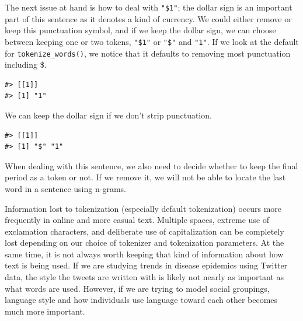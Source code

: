 \documentclass[
]{krantz}
\makeatletter
\newenvironment{Shaded}{\begin{snugshade}}{\end{snugshade}}
\newcommand{\AttributeTok}[1]{\textcolor[rgb]{0.77,0.63,0.00}{#1}}
\newcommand{\ConstantTok}[1]{\textcolor[rgb]{0.00,0.00,0.00}{#1}}
\newcommand{\FunctionTok}[1]{\textcolor[rgb]{0.00,0.00,0.00}{#1}}
\newcommand{\NormalTok}[1]{#1}
\newcommand{\StringTok}[1]{\textcolor[rgb]{0.31,0.60,0.02}{#1}}
\newenvironment{kframe}{%
\medskip{}
\setlength{\fboxsep}{.8em}
 \def\at@end@of@kframe{}%
 \ifinner\ifhmode%
  \def\at@end@of@kframe{\end{minipage}}%
  \begin{minipage}{\columnwidth}%
 \fi\fi%
 \def\FrameCommand##1{\hskip\@totalleftmargin \hskip-\fboxsep
 \colorbox{shadecolor}{##1}\hskip-\fboxsep
     \hskip-\linewidth \hskip-\@totalleftmargin \hskip\columnwidth}%
 \MakeFramed {\advance\hsize-\width
   \@totalleftmargin\z@ \linewidth\hsize
   \@setminipage}}%
 {\par\unskip\endMakeFramed%
 \at@end@of@kframe}
\renewenvironment{Shaded}{\begin{kframe}}{\end{kframe}}
\makeatother
\begin{document}
The next issue at hand is how to deal with \texttt{"\$1"}; the dollar sign is an important part of this sentence as it denotes a kind of currency. We could either remove or keep this punctuation symbol, and if we keep the dollar sign, we can choose between keeping one or two tokens, \texttt{"\$1"} or \texttt{"\$"} and \texttt{"1"}. If we look at the default for \texttt{tokenize\_words()}, we notice that it defaults to removing most punctuation including \$.

\begin{Shaded}
\end{Shaded}

\begin{verbatim}
#> [[1]]
#> [1] "1"
\end{verbatim}

We can keep the dollar sign if we don't strip punctuation.

\begin{Shaded}
\end{Shaded}

\begin{verbatim}
#> [[1]]
#> [1] "$" "1"
\end{verbatim}

When dealing with this sentence, we also need to decide whether to keep the final period as a token or not. If we remove it, we will not be able to locate the last word in a sentence using n-grams.

Information lost to tokenization (especially default tokenization) occurs more frequently in online and more casual text. Multiple spaces, extreme use of exclamation characters, and deliberate use of capitalization can be completely lost depending on our choice of tokenizer and tokenization parameters. At the same time, it is not always worth keeping that kind of information about how text is being used. If we are studying trends in disease epidemics using Twitter data, the style the tweets are written with is likely not nearly as important as what words are used. However, if we are trying to model social groupings, language style and how individuals use language toward each other becomes much more important.
\end{document}
